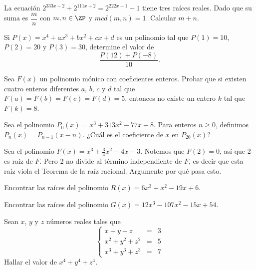 \begin{section-problem}
    La ecuación $2^{333x - 2} + 2^{111x + 2} = 2^{222x + 1} + 1$ tiene tres raíces reales.
    Dado que su suma es $\dfrac{m}{n}$ con $m, n \in \ZP$ y $mcd(m, n) = 1$.
    Calcular $m + n$.
\end{section-problem}

\begin{section-problem}
    Si $P(x) = x^4 + ax^3 + bx^2 + cx + d$ es un polinomio tal que $P(1) = 10$, $P(2) = 20$ y $P(3) = 30$, determine el valor de
    \[\frac{P(12) + P(-8)}{10}.\]
\end{section-problem}

\begin{section-problem}
    Sea $F(x)$ un polinomio mónico con coeficientes enteros.
    Probar que si existen cuatro enteros diferentes $a$, $b$, $c$ y $d$ tal que $F(a) = F(b) = F(c)  = F(d) = 5$,
    entonces no existe un entero $k$ tal que $F(k) = 8$.
\end{section-problem}

\begin{section-problem}
    Sea el polinomio $P_0(x) = x^3 + 313x^2 - 77x - 8$.
    Para enteros $n \geq 0$, definimos $P_n(x) = P_{n - 1}(x - n)$.
    ¿Cuál es el coeficiente de $x$ en $P_{20}(x)$?
\end{section-problem}


\begin{section-problem}
    Sea el polinomio $F(x) = x^3 + \frac{3}{4}x^2 - 4x - 3$.
    Notemos que $F(2) = 0$, así que 2 es raíz de $F$.
    Pero 2 no divide al término independiente de $F$, es decir que esta raíz viola el Teorema de la raíz racional.
    Argumente por qué pasa esto.
\end{section-problem}

\begin{section-problem}
    Encontrar las raíces del polinomio $R(x) = 6x^3 + x^2 - 19x + 6$.
\end{section-problem}

\begin{section-problem}
    Encontrar las raíces del polinomio $G(x) = 12x^3 - 107x^2 - 15x + 54$.
\end{section-problem}



\begin{section-problem}
    Sean $x$, $y$ y $z$ números reales tales que
    \[
        \left\{
        \begin{array}{rcl}
            x + y + z & =& 3\\
            x^2 + y^2 + z^2 & =& 5\\
            x^3 + y^3 + z^3 & =& 7
        \end{array}
        \right.
    \]
    Hallar el valor de $x^4 + y^4 + z^4$.
\end{section-problem}

